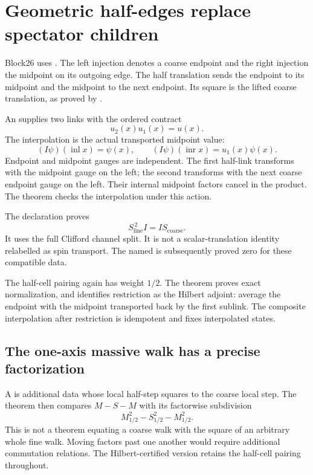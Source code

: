 \section{Geometric half-edges replace spectator children}

Block26 uses . The left injection denotes a coarse endpoint and the right injection the midpoint on its outgoing edge. The half translation sends the endpoint to its midpoint and the midpoint to the next endpoint. Its square is the lifted coarse translation, as proved by .

An  supplies two links with the ordered contract
\[
 u_2(x)u_1(x)=u(x).
\]
The interpolation is the actual transported midpoint value:
\[
 (I\psi)(\operatorname{inl}x)=\psi(x),\qquad
 (I\psi)(\operatorname{inr}x)=u_1(x)\psi(x).
\]
Endpoint and midpoint gauges are independent. The first half-link transforms with the midpoint gauge on the left; the second transforms with the next coarse endpoint gauge on the left. Their internal midpoint factors cancel in the product. The theorem  checks the interpolation under this action.

The declaration  proves
\[
 S_{\mathrm{fine}}^{\,2}I=IS_{\mathrm{coarse}}.
\]
It uses the full Clifford channel split. It is not a scalar-translation identity relabelled as spin transport. The named  is subsequently proved zero for these compatible data.

The half-cell pairing again has weight \(1/2\). The theorem  proves exact normalization, and  identifies restriction as the Hilbert adjoint: average the endpoint with the midpoint transported back by the first sublink. The composite interpolation after restriction is idempotent and fixes interpolated states.

\subsection{The one-axis massive walk has a precise factorization}

A  is additional data whose local half-step squares to the coarse local step. The theorem  then compares \(M-S-M\) with its factorwise subdivision
\[
 M_{1/2}^{2}-S_{1/2}^{2}-M_{1/2}^{2}.
\]
This is not a theorem equating a coarse walk with the square of an arbitrary whole fine walk. Moving factors past one another would require additional commutation relations. The Hilbert-certified version retains the half-cell pairing throughout.


